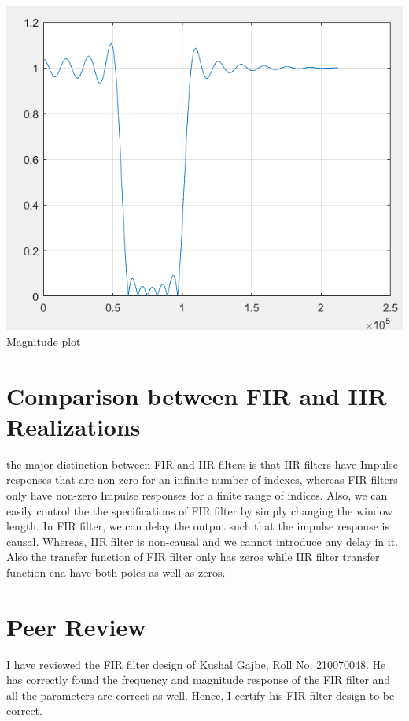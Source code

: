 \documentclass{article}
\begin{document}
\begin{center}
    \includegraphics[scale=0.75]{bs_mag_fir.png}\\
    Magnitude plot
\end{center}
\newpage

\section{Comparison between FIR and IIR Realizations}
the major distinction between FIR and IIR filters is that IIR filters have Impulse responses that are non-zero for an infinite number of indexes, whereas FIR filters only have non-zero Impulse responses for a finite range of indices. Also, we can easily control the the specifications of FIR filter by simply changing the window length. In FIR filter, we can delay the output such that the impulse response is causal. Whereas, IIR filter is non-causal and we cannot introduce any delay in it. Also the transfer function of FIR filter only has zeros while IIR filter transfer function cna have both poles as well as zeros.

\section{Peer Review}

I have reviewed the FIR filter design of Kushal Gajbe, Roll No. 210070048. He has correctly found the frequency and magnitude response of the FIR filter and all the parameters are correct as well. Hence, I certify his FIR filter design to be correct.
\end{document}
